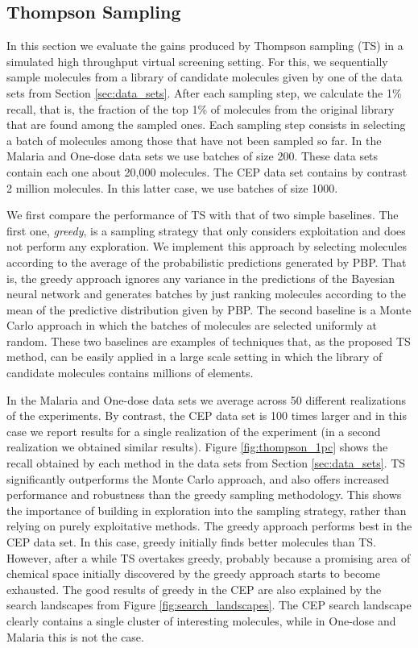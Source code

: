 \subsection{Thompson Sampling}

In this section we evaluate the gains produced by Thompson sampling (TS) in a simulated high throughput virtual screening setting. For this, we sequentially sample molecules from a library of candidate molecules given by one of the data sets from Section \ref{sec:data_sets}. After each sampling step, we calculate the 1\% recall, that is, the fraction of the top 1\% of molecules from the original library that are found among the sampled ones. Each sampling step consists in selecting a batch of molecules among those that have not been sampled so far. In the Malaria and One-dose data sets we use batches of size 200. These data sets contain each one about 20,000 molecules. The CEP data set contains by contrast 2 million molecules. In this latter case, we use batches of size 1000. 

We first compare the performance of TS with that of two simple baselines. The first one, \emph{greedy}, is a sampling strategy that only considers exploitation and does not perform any exploration. We implement this approach by selecting molecules according to the average of the probabilistic predictions generated by PBP. That is, the greedy approach ignores any variance in the predictions of the Bayesian neural network and generates batches by just ranking molecules according to the mean of the predictive distribution given by PBP. The second baseline is a Monte Carlo approach in which the batches of molecules are selected uniformly at random. These two baselines are examples of techniques that, as the proposed TS method, can be easily applied in a large scale setting in which the library of candidate molecules contains millions of elements.

In the Malaria and One-dose data sets we average across 50 different realizations of the experiments. By contrast, the CEP data set is 100 times larger and in this case we report results for a single realization of the experiment (in a second realization we obtained similar results). 
Figure \ref{fig:thompson_1pc} shows the recall obtained by each method in the data sets from 
Section \ref{sec:data_sets}. TS significantly outperforms the Monte Carlo approach, and also offers increased performance and robustness than the greedy sampling methodology. This shows the importance of building in exploration into the sampling strategy, rather than relying on purely exploitative methods. The greedy approach performs best in the CEP data set. In this case, greedy initially finds better molecules than TS. However, after a while TS overtakes greedy, probably because a promising area of chemical space 
initially discovered by the greedy approach starts to become exhausted. The good results of greedy in the CEP are also explained by the search landscapes from Figure \ref{fig:search_landscapes}. The CEP search landscape clearly contains a single cluster of interesting molecules, while in One-dose and Malaria this is not the case.

